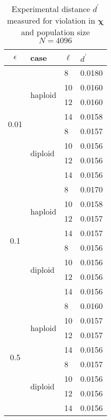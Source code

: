 \begin{table}[ht]
\caption{Experimental distance $d^\prime$ measured for violation in $\bm{\chi}$ and population size $N = 4096$ }
\centering
\begin{tabularx}{0.75\textwidth}{ c *{3}{X}}
\toprule
$\epsilon$ & case & $\ell$ & $d^\prime$ \\
\midrule
\multirow{8}{*}{0.01} & \multirow{4}{*}{haploid} 	& 8 & 0.0180 \\
		      &   				& 10 & 0.0160 \\ 
		      & 			 	& 12 & 0.0160 \\
		      &  	 			& 14 & 0.0158 \\ 
		      \cmidrule(l){2-4}
		      & \multirow{4}{*}{diploid} 	& 8 & 0.0157 \\
		      &  	 			& 10 & 0.0156 \\
		      & 			 	& 12 & 0.0156 \\
		      &  	 			& 14 & 0.0156 \\
		      \midrule
\multirow{8}{*}{0.1} & \multirow{4}{*}{haploid} 	& 8 & 0.0170 \\
		      &   				& 10 & 0.0158 \\	
		      & 				& 12 & 0.0157 \\	
		      &  	 			& 14 & 0.0157 \\
		      \cmidrule(l){2-4}
		      & \multirow{4}{*}{diploid} 	& 8 & 0.0156 \\
		      &  	 			& 10 & 0.0156 \\
		      & 				& 12 & 0.0156 \\
		      &  	 			& 14 & 0.0156 \\
		      \midrule
\multirow{8}{*}{0.5} & \multirow{4}{*}{haploid} 	& 8 & 0.0160 \\
		      &   				& 10 & 0.0157 \\
		      & 				& 12 & 0.0157 \\
		      &  	 			& 14 & 0.0156 \\
		      \cmidrule(l){2-4}
		      & \multirow{4}{*}{diploid} 	& 8 & 0.0157 \\	
		      &  	 			& 10 & 0.0156 \\
		      &  				& 12 & 0.0156 \\
		      &  	 			& 14 & 0.0156 \\
\bottomrule
\end{tabularx}
\label{ditanceChi4096}
\end{table} 


